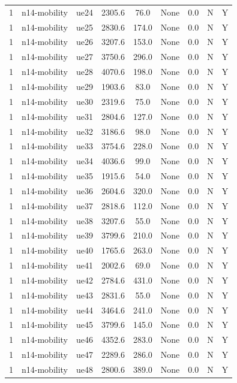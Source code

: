 \begin{table}[ht]
\begin{tabular}{|c|c|c|c|c|c|c|c|c|}
1 & n14-mobility & ue24 & 2305.6 & 76.0 & None & 0.0 & N & Y \\
1 & n14-mobility & ue25 & 2830.6 & 174.0 & None & 0.0 & N & Y \\
1 & n14-mobility & ue26 & 3207.6 & 153.0 & None & 0.0 & N & Y \\
1 & n14-mobility & ue27 & 3750.6 & 296.0 & None & 0.0 & N & Y \\
1 & n14-mobility & ue28 & 4070.6 & 198.0 & None & 0.0 & N & Y \\
1 & n14-mobility & ue29 & 1903.6 & 83.0 & None & 0.0 & N & Y \\
1 & n14-mobility & ue30 & 2319.6 & 75.0 & None & 0.0 & N & Y \\
1 & n14-mobility & ue31 & 2804.6 & 127.0 & None & 0.0 & N & Y \\
1 & n14-mobility & ue32 & 3186.6 & 98.0 & None & 0.0 & N & Y \\
1 & n14-mobility & ue33 & 3754.6 & 228.0 & None & 0.0 & N & Y \\
1 & n14-mobility & ue34 & 4036.6 & 99.0 & None & 0.0 & N & Y \\
1 & n14-mobility & ue35 & 1915.6 & 54.0 & None & 0.0 & N & Y \\
1 & n14-mobility & ue36 & 2604.6 & 320.0 & None & 0.0 & N & Y \\
1 & n14-mobility & ue37 & 2818.6 & 112.0 & None & 0.0 & N & Y \\
1 & n14-mobility & ue38 & 3207.6 & 55.0 & None & 0.0 & N & Y \\
1 & n14-mobility & ue39 & 3799.6 & 210.0 & None & 0.0 & N & Y \\
1 & n14-mobility & ue40 & 1765.6 & 263.0 & None & 0.0 & N & Y \\
1 & n14-mobility & ue41 & 2002.6 & 69.0 & None & 0.0 & N & Y \\
1 & n14-mobility & ue42 & 2784.6 & 431.0 & None & 0.0 & N & Y \\
1 & n14-mobility & ue43 & 2831.6 & 55.0 & None & 0.0 & N & Y \\
1 & n14-mobility & ue44 & 3464.6 & 241.0 & None & 0.0 & N & Y \\
1 & n14-mobility & ue45 & 3799.6 & 145.0 & None & 0.0 & N & Y \\
1 & n14-mobility & ue46 & 4352.6 & 283.0 & None & 0.0 & N & Y \\
1 & n14-mobility & ue47 & 2289.6 & 286.0 & None & 0.0 & N & Y \\
1 & n14-mobility & ue48 & 2800.6 & 389.0 & None & 0.0 & N & Y \\

\end{tabular}
\end{table}
